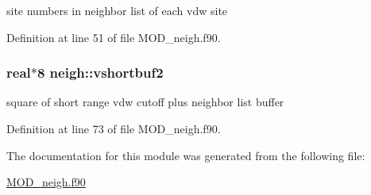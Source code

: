 site numbers in neighbor list of each vdw site 



Definition at line 51 of file M\-O\-D\-\_\-neigh.\-f90.

\hypertarget{classneigh_a2f24e9959d5d21f7677ab4f702359f4e}{
\subsubsection[{vshortbuf2}]{\setlength{\rightskip}{0pt plus 5cm}real$\ast$8 neigh\-::vshortbuf2}}\label{classneigh_a2f24e9959d5d21f7677ab4f702359f4e}


square of short range vdw cutoff plus neighbor list buffer 



Definition at line 73 of file M\-O\-D\-\_\-neigh.\-f90.



The documentation for this module was generated from the following file\-:\begin{DoxyCompactItemize}
\item 
\hyperlink{MOD__neigh_8f90}{M\-O\-D\-\_\-neigh.\-f90}\end{DoxyCompactItemize}
